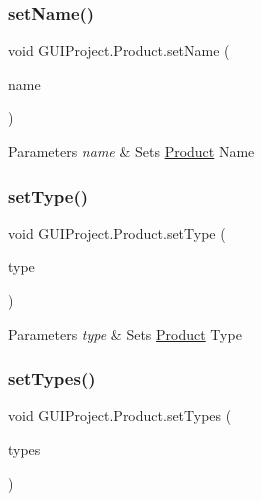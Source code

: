 \subsubsection{\texorpdfstring{setName()}{setName()}}
{\footnotesize\ttfamily void G\+U\+I\+Project.\+Product.\+set\+Name (\begin{DoxyParamCaption}\item[{String}]{name }\end{DoxyParamCaption})}


\begin{DoxyParams}{Parameters}
{\em name} & Sets \mbox{\hyperlink{class_g_u_i_project_1_1_product}{Product}} Name \\
\hline
\end{DoxyParams}
\mbox{\label{class_g_u_i_project_1_1_product_a258ba067308d3fd8639a64c5e190bbfb}} 
\subsubsection{\texorpdfstring{setType()}{setType()}}
{\footnotesize\ttfamily void G\+U\+I\+Project.\+Product.\+set\+Type (\begin{DoxyParamCaption}\item[{String}]{type }\end{DoxyParamCaption})}


\begin{DoxyParams}{Parameters}
{\em type} & Sets \mbox{\hyperlink{class_g_u_i_project_1_1_product}{Product}} Type \\
\hline
\end{DoxyParams}
\mbox{\label{class_g_u_i_project_1_1_product_aea49404489bdc6234cb838d6a8151bd4}} 
\subsubsection{\texorpdfstring{setTypes()}{setTypes()}}
{\footnotesize\ttfamily void G\+U\+I\+Project.\+Product.\+set\+Types (\begin{DoxyParamCaption}\item[{\mbox{\hyperlink{enum_g_u_i_project_1_1_item_type}{Item\+Type}}}]{types }\end{DoxyParamCaption})}


